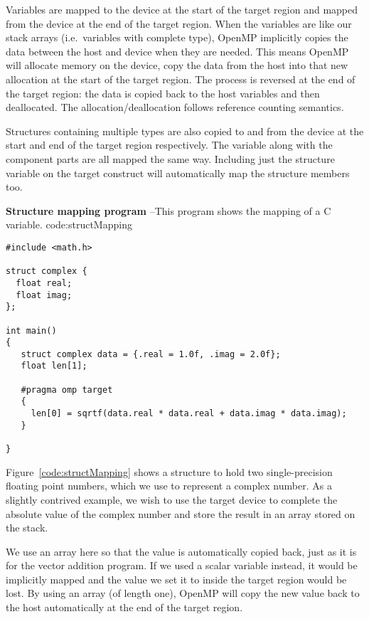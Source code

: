 Variables are mapped to the device at the start of the target region and mapped from the device at the end of the target region.
When the variables are like our stack arrays (i.e.\ variables with complete type), OpenMP implicitly copies the data between the host and device when they are needed.
This means OpenMP will allocate memory on the device, copy the data from the host into that new allocation at the start of the target region.
The process is reversed at the end of the target region: the data is copied back to the host variables and then deallocated.
The allocation/deallocation follows reference counting semantics.

Structures containing multiple types are also copied to and from the device at the start and end of the target region respectively.
The variable along with the component parts are all mapped the same way.
Including just the structure variable on the target construct will automatically map the structure members too.


\begin{CodeExample}%
{\textbf{Structure mapping program} --\small This program shows the mapping of a C  variable.
}%
{code:structMapping}
\begin{lstlisting}
#include <math.h>

struct complex {
  float real;
  float imag;
};

int main()
{
   struct complex data = {.real = 1.0f, .imag = 2.0f};
   float len[1];

   #pragma omp target
   {
     len[0] = sqrtf(data.real * data.real + data.imag * data.imag);
   }

}	  
\end{lstlisting}
\end{CodeExample}


Figure~\ref{code:structMapping} shows a structure to hold two single-precision floating point numbers, which we use to represent a complex number.
As a slightly contrived example, we wish to use the target device to complete the absolute value of the complex number and store the result in an array stored on the stack.

We use an array here so that the value is automatically copied back, just as it is for the vector addition program.
If we used a scalar variable instead, it would be implicitly mapped  and the value we set it to inside the target region would be lost.
By using an array (of length one), OpenMP will copy the new value back to the host automatically at the end of the target region.

